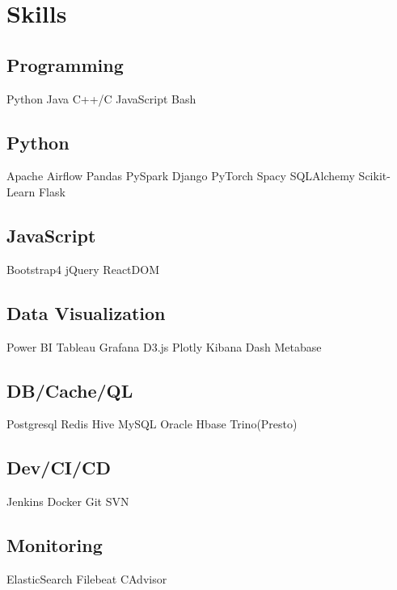 \documentclass[]{Vishnu-Resume}
\begin{document}
\begin{minipage}[t]{0.33\textwidth}

\section{Skills}
\subsection{Programming}
Python \textbullet{} Java \textbullet{} C++/C  \textbullet{} JavaScript \textbullet{} Bash
\sectionsep

\subsection{Python}
Apache Airflow \textbullet{} Pandas \textbullet{} PySpark  \textbullet{} Django \textbullet{} PyTorch  \textbullet{} Spacy   \textbullet{} SQLAlchemy  \textbullet{} Scikit-Learn \textbullet{} Flask
\sectionsep

\subsection{JavaScript}
Bootstrap4 \textbullet{} jQuery \textbullet{} ReactDOM 
\sectionsep

\subsection{Data Visualization}
Power BI \textbullet{} Tableau \textbullet{} Grafana \textbullet{} D3.js  \textbullet{} Plotly \textbullet{} Kibana \textbullet{} Dash \textbullet{} Metabase
\sectionsep

\subsection{DB/Cache/QL}
 Postgresql  \textbullet{} Redis  \textbullet{} Hive  \textbullet{} MySQL  \textbullet{} Oracle  \textbullet{} Hbase  \textbullet{} Trino(Presto)
\sectionsep

\subsection{Dev/CI/CD}
Jenkins \textbullet{} Docker \textbullet{} Git \textbullet{} SVN
\sectionsep


\subsection{Monitoring}
ElasticSearch \textbullet{} Filebeat \textbullet{} CAdvisor
\sectionsep


\end{minipage}
\end{document}
